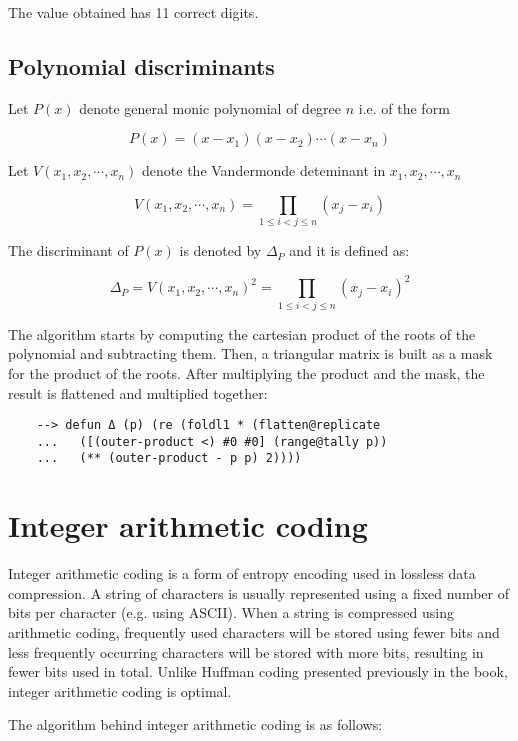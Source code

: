 The value obtained has 11 correct digits.

\subsection{Polynomial discriminants}

Let $P(x)$ denote general monic polynomial of degree $n$ i.e. of the form

$$
P(x) = (x-x_1)(x-x_2) \cdots (x-x_n)
$$

\noindent Let $V(x_1,x_2, \cdots, x_n)$ denote the Vandermonde deteminant in $x_1,x_2, \cdots, x_n$

$$
V(x_1,x_2, \cdots , x_n) = \prod\limits_{1 \leq i < j \leq n} (x_j - x_i)
$$

\noindent The discriminant of $P(x)$ is denoted by $\Delta_P$ and it is defined as:

$$
\Delta_P = V(x_1,x_2, \cdots , x_n)^2 = \prod\limits_{1 \leq i < j \leq n} (x_j - x_i)^2
$$

The algorithm starts by computing the cartesian product of the roots of the polynomial and subtracting them. Then, a triangular matrix is built as a mask for the product of the roots. After multiplying the product and the mask, the result is flattened and multiplied together:

\begin{Verbatim}
    --> defun Δ (p) (re (foldl1 * (flatten@replicate
    ...   ([(outer-product <) #0 #0] (range@tally p))
    ...   (** (outer-product - p p) 2))))
\end{Verbatim}

\section{Integer arithmetic coding}

Integer arithmetic coding is a form of entropy encoding used in lossless data compression. A string of characters is usually represented using a fixed number of bits per character (e.g. using ASCII). When a string is compressed using arithmetic coding, frequently used characters will be stored using fewer bits and less frequently occurring characters will be stored with more bits, resulting in fewer bits used in total. Unlike Huffman coding presented previously in the book, integer arithmetic coding is optimal.

The algorithm behind integer arithmetic coding is as follows:

